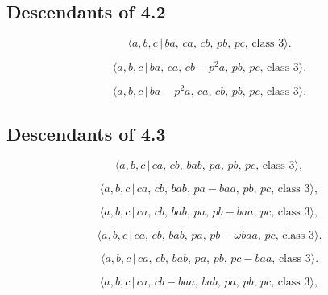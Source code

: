 \documentclass[10pt]{article}
\begin{document}
\subsection{Descendants of 4.2}

\begin{equation}
\langle a,b,c\,|\,ba,\,ca,\,cb,\,pb,\,pc,\,\text{class }3\rangle . 
\tag{5.24}
\end{equation}

\begin{equation}
\langle a,b,c\,|\,ba,\,ca,\,cb-p^{2}a,\,pb,\,pc,\,\text{class }3\rangle . 
\tag{5.25}
\end{equation}

\begin{equation}
\langle a,b,c\,|\,ba-p^{2}a,\,ca,\,cb,\,pb,\,pc,\,\text{class }3\rangle . 
\tag{5.26}
\end{equation}

\subsection{Descendants of 4.3}

\begin{equation}
\langle a,b,c\,|\,ca,\,cb,\,bab,\,pa,\,pb,\,pc,\,\text{class }3\rangle , 
\tag{5.27}
\end{equation}

\begin{equation}
\langle a,b,c\,|\,ca,\,cb,\,bab,\,pa-baa,\,pb,\,pc,\,\text{class }3\rangle ,
\tag{5.28}
\end{equation}

\begin{equation}
\langle a,b,c\,|\,ca,\,cb,\,bab,\,pa,\,pb-baa,\,pc,\,\text{class }3\rangle ,
\tag{5.29}
\end{equation}

\begin{equation}
\langle a,b,c\,|\,ca,\,cb,\,bab,\,pa,\,pb-\omega baa,\,pc,\,\text{class }%
3\rangle .  \tag{5.30}
\end{equation}

\begin{equation}
\langle a,b,c\,|\,ca,\,cb,\,bab,\,pa,\,pb,\,pc-baa,\,\text{class }3\rangle .
\tag{5.31}
\end{equation}

\begin{equation}
\langle a,b,c\,|\,ca,\,cb-baa,\,bab,\,pa,\,pb,\,pc,\,\text{class }3\rangle ,
\tag{5.32}
\end{equation}
\end{document}
